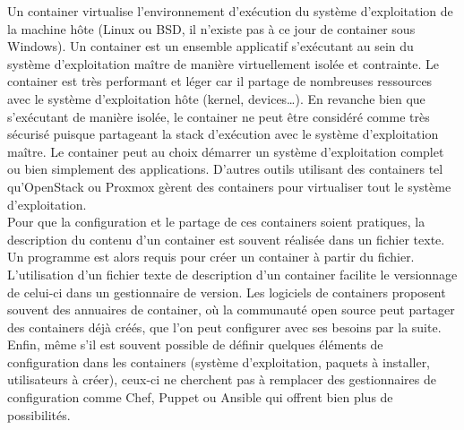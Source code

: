         Un container virtualise l'environnement d'exécution du système d'exploitation de la machine hôte (Linux ou BSD, il n'existe pas à ce jour de container sous Windows). Un container est un ensemble applicatif s'exécutant au sein du système d'exploitation maître de manière virtuellement isolée et contrainte. Le container est très performant et léger car il partage de nombreuses ressources avec le système d'exploitation hôte (kernel, devices\dots). En revanche bien que s'exécutant de manière isolée, le container ne peut être considéré comme très sécurisé puisque partageant la stack d'exécution avec le système d'exploitation maître. Le container peut au choix démarrer un système d'exploitation complet ou bien simplement des applications. D'autres outils utilisant des containers tel qu'OpenStack ou Proxmox gèrent des containers pour virtualiser tout le système d'exploitation.\\

        Pour que la configuration et le partage de ces containers soient pratiques, la description du contenu d'un container est souvent réalisée dans un fichier texte. Un programme est alors requis pour créer un container à partir du fichier. L'utilisation d'un fichier texte de description d'un container facilite le versionnage de celui-ci dans un gestionnaire de version. Les logiciels de containers proposent souvent des annuaires de container, où la communauté open source peut partager des containers déjà créés, que l'on peut configurer avec ses besoins par la suite.\\

        Enfin, même s'il est souvent possible de définir quelques éléments de configuration dans les containers (système d'exploitation, paquets à installer, utilisateurs à créer), ceux-ci ne cherchent pas à remplacer des gestionnaires de configuration comme Chef, Puppet ou Ansible qui offrent bien plus de possibilités.
